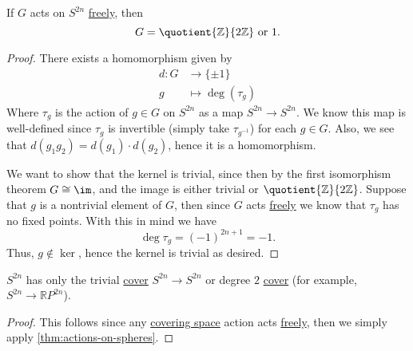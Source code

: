 \begin{theorem}\label{thm:actions-on-spheres}
	If \(G\) acts on \(S^{2n}\) \hyperref[def:free-group]{freely}, then
	\[
		G = \quotient{\mathbb{Z}}{2\mathbb{Z}} \text{ or } 1.
	\]
\end{theorem}
\begin{proof}
	There exists a homomorphism given by
	\[
		\begin{split}
			d\colon G & \to \{\pm 1\}        \\
			g         & \mapsto \deg(\tau_g)
		\end{split}
	\]
	Where \(\tau_g\) is the action of \(g \in G\) on \(S^{2n}\) as a map \(S^{2n} \to S^{2n}\). We know this map is well-defined since \(\tau_g\) is invertible (simply take \(\tau_{g^{-1}}\)) for each \(g \in G\). Also, we see that \(d(g_1 g_2) = d(g_1) \cdot d(g_2)\), hence it is a homomorphism.

	We want to show that the kernel is trivial, since then by the first isomorphism theorem \(G \cong \im\), and the image is either trivial or \(\quotient{\mathbb{Z}}{2\mathbb{Z}}\). Suppose that \(g\) is a nontrivial element of \(G\), then since \(G\) acts \hyperref[def:free-group]{freely} we know that \(\tau_g\) has no fixed points. With this in mind we have
	\[
		\deg \tau_g = (-1)^{2n + 1} = - 1.
	\]
	Thus, \(g \not\in \ker\), hence the kernel is trivial as desired.
\end{proof}

\begin{corollary}
	\(S^{2n}\) has only the trivial \hyperref[def:covering-space]{cover} \(S^{2n} \to S^{2n}\) or degree \(2\) \hyperref[def:covering-space]{cover} (for example, \(S^{2n} \to \mathbb{R}P^{2n}\)).
\end{corollary}
\begin{proof}
	This follows since any \hyperref[def:covering-space]{covering space} action acts \hyperref[def:free-group]{freely}, then we simply apply \autoref{thm:actions-on-spheres}.
\end{proof}

